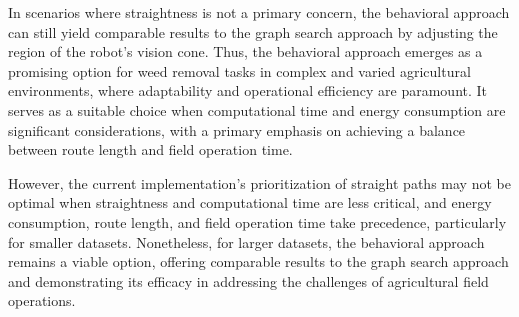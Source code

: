 In scenarios where straightness is not a primary concern, the behavioral approach can still yield comparable results to the graph search approach by adjusting the region of the robot's vision cone. Thus, the behavioral approach emerges as a promising option for weed removal tasks in complex and varied agricultural environments, where adaptability and operational efficiency are paramount. It serves as a suitable choice when computational time and energy consumption are significant considerations, with a primary emphasis on achieving a balance between route length and field operation time.

\vspace{3mm} 

However, the current implementation's prioritization of straight paths may not be optimal when straightness and computational time are less critical, and energy consumption, route length, and field operation time take precedence, particularly for smaller datasets. Nonetheless, for larger datasets, the behavioral approach remains a viable option, offering comparable results to the graph search approach and demonstrating its efficacy in addressing the challenges of agricultural field operations.